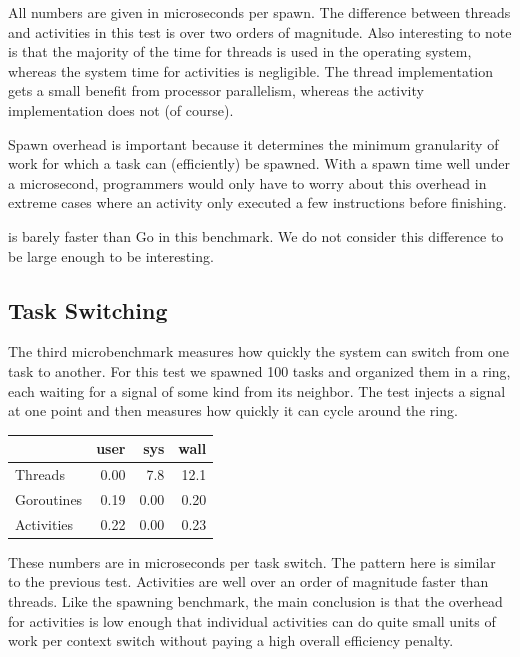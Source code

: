 \documentclass[9pt,preprint]{sigplanconf}
\begin{document}
All numbers are given in microseconds per spawn.
The difference between threads and activities in this test is over two orders of magnitude.
Also interesting to note is that the majority of the time for threads is used in the operating system, whereas the system time for activities is negligible.
The thread implementation gets a small benefit from processor parallelism, whereas the activity implementation does not (of course).

Spawn overhead is important because it determines the minimum granularity of work for which a task can (efficiently) be spawned.
With a spawn time well under a microsecond, programmers would only have to worry about this overhead in extreme cases where an activity only executed a few instructions before finishing.

\charcoal{} is barely faster than Go in this benchmark.
We do not consider this difference to be large enough to be interesting.

\subsection{Task Switching}

The third microbenchmark measures how quickly the system can switch from one task to another.
For this test we spawned 100 tasks and organized them in a ring, each waiting for a signal of some kind from its neighbor.
The test injects a signal at one point and then measures how quickly it can cycle around the ring.

\vspace{1em}
\begin{tabular}{|l|r|r|r|}
  \hline
   & user & sys & wall \\
  \hline
  \hline
  Threads & 0.00 & 7.8 & 12.1 \\
  \hline
  Goroutines & 0.19 & 0.00 & 0.20 \\
  \hline
  Activities & 0.22 & 0.00 & 0.23 \\
  \hline
\end{tabular}
\vspace{1em}

These numbers are in microseconds per task switch.
The pattern here is similar to the previous test.
Activities are well over an order of magnitude faster than threads.
Like the spawning benchmark, the main conclusion is that the overhead for activities is low enough that individual activities can do quite small units of work per context switch without paying a high overall efficiency penalty.
\end{document}
